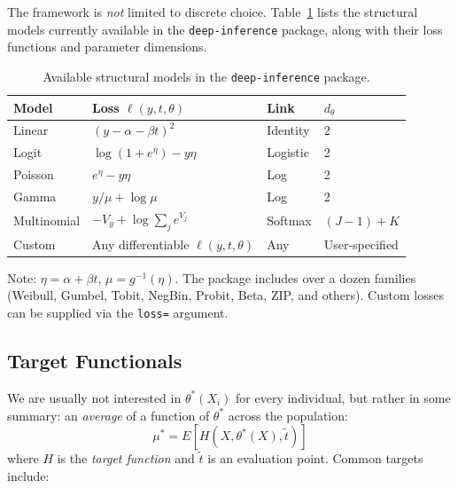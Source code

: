 The framework is \emph{not} limited to discrete choice. Table~\ref{tab:models} lists the structural models currently available in the \texttt{deep-inference} package, along with their loss functions and parameter dimensions.

\begin{table}[ht]
\centering
\caption{Available structural models in the \texttt{deep-inference} package.}\label{tab:models}
\begin{tabular}{llll}
\toprule
\textbf{Model} & \textbf{Loss} $\ell(y,t,\theta)$ & \textbf{Link} & $d_\theta$ \\
\midrule
Linear      & $(y - \alpha - \beta t)^2$                                & Identity & 2 \\
Logit       & $\log(1+e^\eta) - y\eta$                                  & Logistic & 2 \\
Poisson     & $e^\eta - y\eta$                                          & Log      & 2 \\
Gamma       & $y/\mu + \log \mu$                                        & Log      & 2 \\
Multinomial & $-V_y + \log\sum_j e^{V_j}$                               & Softmax  & $(J\!-\!1)\!+\!K$ \\
Custom      & Any differentiable $\ell(y,t,\theta)$                     & Any      & User-specified \\
\bottomrule
\end{tabular}
\begin{tablenotes}\small
\item Note: $\eta = \alpha + \beta t$, $\mu = g^{-1}(\eta)$. The package includes over a dozen families (Weibull, Gumbel, Tobit, NegBin, Probit, Beta, ZIP, and others). Custom losses can be supplied via the \texttt{loss=} argument.
\end{tablenotes}
\end{table}

\subsection{Target Functionals}

We are usually not interested in $\theta^*(X_i)$ for every individual, but rather in some summary: an \emph{average} of a function of $\theta^*$ across the population:
\begin{equation}\label{eq:target}
    \mu^* = E[H(X, \theta^*(X), \tilde{t})]
\end{equation}
where $H$ is the \emph{target function} and $\tilde{t}$ is an evaluation point. Common targets include:

